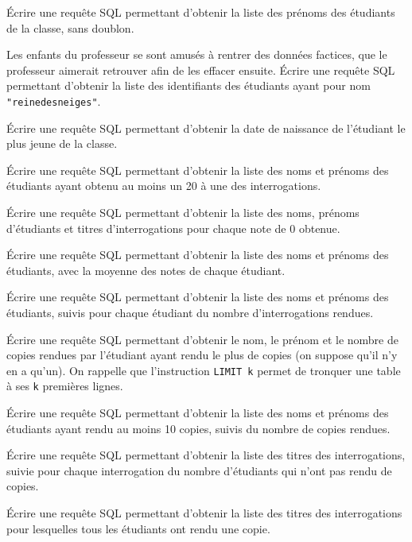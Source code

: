 \question{} Écrire une requête SQL permettant d'obtenir la liste des prénoms des étudiants de la classe, sans doublon.

\medskip{}

\question{} Les enfants du professeur se sont amusés à rentrer des données factices, que le professeur aimerait retrouver afin de les effacer ensuite. 
Écrire une requête SQL permettant d'obtenir la liste des identifiants des étudiants ayant pour nom \texttt{"reinedesneiges"}.

\medskip{}

\question{} Écrire une requête SQL permettant d'obtenir la date de naissance de l'étudiant le plus jeune de la classe. 

\medskip{}

\question{} Écrire une requête SQL permettant d'obtenir la liste des noms et prénoms des étudiants ayant obtenu au moins un 20 à une des interrogations. 

\medskip{}

\question{} Écrire une requête SQL permettant d'obtenir la liste des noms, prénoms d'étudiants et titres d'interrogations pour chaque note de 0 obtenue. 

\medskip{}

\question{} Écrire une requête SQL permettant d'obtenir la liste des noms et prénoms des étudiants, avec la moyenne des notes de chaque étudiant.

\medskip{}

\question{} Écrire une requête SQL permettant d'obtenir la liste des noms et prénoms des étudiants, suivis pour chaque étudiant du nombre d'interrogations rendues.

\medskip{} 

\question{} Écrire une requête SQL permettant d'obtenir le nom, le prénom et le nombre de copies rendues par l'étudiant ayant rendu le plus de copies (on suppose qu'il n'y en a qu'un). 
  On rappelle que l'instruction \texttt{LIMIT k} permet de tronquer une table à ses \texttt{k} premières lignes.
  
\medskip{}

\question{} Écrire une requête SQL permettant d'obtenir la liste des noms et prénoms des étudiants ayant rendu au moins 10 copies, suivis du nombre de copies rendues. 

\medskip{}

\question{} Écrire une requête SQL permettant d'obtenir la liste des titres des interrogations, suivie pour chaque interrogation du nombre d'étudiants qui n'ont pas rendu de copies. 

\medskip{}

\question{} Écrire une requête SQL permettant d'obtenir la liste des titres des interrogations pour lesquelles tous les étudiants ont rendu une copie. 

